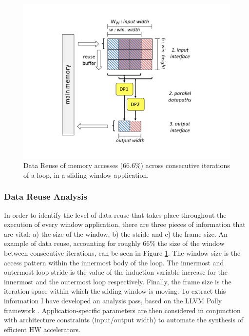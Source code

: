 \documentclass[]{usiinfthesis}
\begin{document}
\begin{figure}[t]
\centering
\vspace{-0.4cm}
\includegraphics[width= .8 \linewidth]{figs/Data_Reuse}
\vspace*{-1cm}
\caption{Data Reuse of memory accesses (66.6\%) across consecutive iterations of a loop, in a sliding
window application.}
\label{fig:data_reuse}
\end{figure}


\subsubsection{Data Reuse Analysis}

In order to identify the level of data reuse that takes place throughout the execution of every
window application, there are three pieces of information that are vital: a) the size of the window, 
b) the stride and c) the frame size.
An example of data reuse, accounting for roughly 66\% the size of the window between consecutive 
iterations, can be seen in Figure \ref{fig:data_reuse}.
The window size is the access pattern
within the innermost body of the loop. The innermost and outermost
loop stride is the value of the induction variable increase for the innermost
and the outermost loop respectively. Finally, the frame size is
the iteration space within which the sliding window is moving. To extract this information 
I have developed an analysis pass, based on the LLVM Polly framework \cite{GrosserApr12}. 
Application-specific parameters are then considered in conjunction with architecture constraints 
(input/output width) to automate the synthesis of efficient HW accelerators.\par
\end{document}
